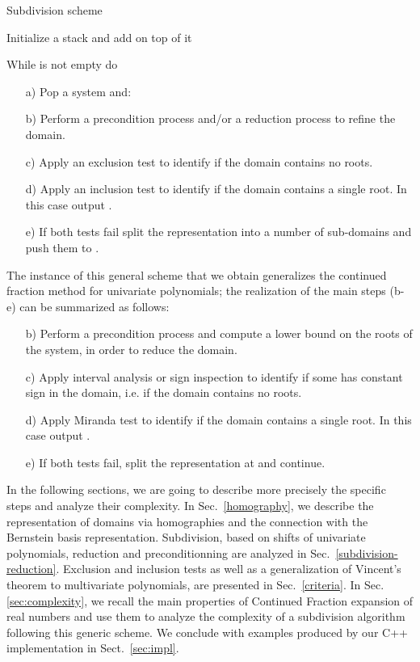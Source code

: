\documentclass{sig-alternate}
\begin{document}
\begin{algorithm} \label{algo:subdivision}
\caption{Subdivision scheme}

Initialize a stack  and add  on top of it\;

While  is not empty do 
\begin{enumerate}
\item[a)] Pop a system  and:
\item[b)] Perform a precondition process and/or a reduction process to
  refine the domain.
\item[c)] Apply an exclusion test to identify if the domain contains
  no roots.
\item[d)] Apply an inclusion test to identify if the domain contains a
  single root. In this case output .
\item[e)] If both tests fail split the representation into a number of
  sub-domains and push them to .
\end{enumerate}
\end{algorithm}
The instance of this general scheme that we obtain generalizes the
continued fraction method for univariate polynomials; the realization of the
main steps (b-e) can be summarized as follows: 
\begin{enumerate}
\item[b)] Perform a precondition process and compute a lower bound on
  the roots of the system, in order to reduce the domain.
\item[c)] Apply interval analysis or sign inspection to identify if some
   has constant sign in the domain, i.e. if the domain contains
  no roots.
\item[d)] Apply Miranda test to identify if the domain contains a
  single root. In this case output .
\item[e)] If both tests fail, split the representation at 
  and continue.
\end{enumerate}

In the following sections, we are going to describe more precisely the
specific steps and analyze their complexity.
In Sec.~\ref{homography}, we describe the representation of domains via
homographies and the connection with the Bernstein basis representation.
Subdivision, based on shifts of univariate polynomials, reduction and
preconditionning are analyzed in Sec.~\ref{subdivision-reduction}.
Exclusion and inclusion tests as well as a generalization of Vincent's
theorem to multivariate polynomials, are presented in
Sec.~\ref{criteria}.
In Sec. \ref{sec:complexity}, we recall the main properties of
Continued Fraction expansion of real numbers and use them to analyze
the complexity of a subdivision algorithm following this generic
scheme.
We conclude with examples produced by our C++ implementation in
Sect.~\ref{sec:impl}.
\end{document}
